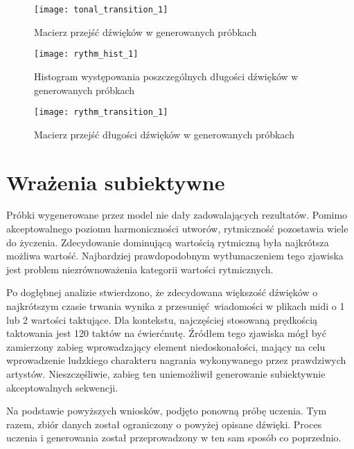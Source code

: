 {{        %
        \begin{figure}
            \centering
            \texttt{[image: tonal\_transition\_1]}
            \caption{Macierz przejść dźwięków w generowanych próbkach}
            \label{tonal_transition_1}
        \end{figure}

        \begin{figure}
            \centering
            \texttt{[image: rythm\_hist\_1]}
            \caption{Histogram występowania poszczególnych długości dźwięków w generowanych próbkach}
            \label{rythm_hist_1}
        \end{figure}

        \begin{figure}
            \centering
            \texttt{[image: rythm\_transition\_1]}
            \caption{Macierz przejść długości dźwięków w generowanych próbkach}
            \label{rythm_transition_1}
        \end{figure}
    }

    \section{Wrażenia subiektywne}
    {
        Próbki wygenerowane przez model nie dały zadowalających rezultatów. Pomimo akceptowalnego poziomu 
        harmoniczności utworów, rytmiczność pozostawia wiele do życzenia. Zdecydowanie dominującą wartością 
        rytmiczną była najkrótsza możliwa wartość. Najbardziej prawdopodobnym wytłumaczeniem tego zjawiska jest 
        problem niezrównoważenia kategorii wartości rytmicznych. 

        Po dogłębnej analizie stwierdzono, że zdecydowana większość dźwięków o najkrótszym czasie trwania
        wynika z przesunięć wiadomości w plikach midi o 1 lub 2 wartości taktujące. Dla kontekstu, najczęściej stosowaną
        prędkością taktowania jest 120 taktów na ćwierćnutę. Źródłem tego zjawiska mógł być zamierzony 
        zabieg wprowadzający element niedoskonałości, mający na celu wprowadzenie ludzkiego charakteru nagrania 
        wykonywanego przez prawdziwych artystów.
        Nieszczęśliwie, zabieg ten uniemożliwił generowanie subiektywnie akceptowalnych sekwencji.

        Na podstawie powyższych wniosków, podjęto ponowną próbę uczenia. Tym razem, zbiór danych został
        ograniczony o powyżej opisane dźwięki. Proces uczenia i generowania został przeprowadzony w ten sam sposób
        co poprzednio. 

}}
